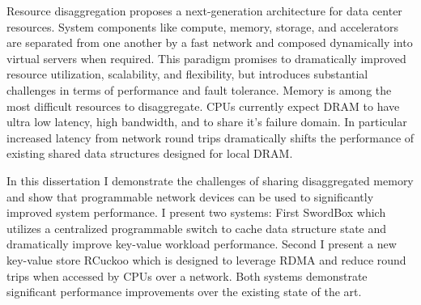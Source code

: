 \documentclass[12pt]{ucsddissertation}
\newcommand{\sword}{SwordBox}
\begin{document}
\begin{dissertationabstract} 
Resource disaggregation proposes a next-generation architecture for data center resources. System
components like compute, memory, storage, and accelerators are separated from one another by a fast
network and composed dynamically into virtual servers when required. This paradigm promises to
dramatically improved resource utilization, scalability, and flexibility, but introduces substantial
challenges in terms of performance and fault tolerance. Memory is among the most difficult resources
to disaggregate. CPUs currently expect DRAM to have ultra low latency, high bandwidth, and to share it's
failure domain. In particular increased latency from network round trips dramatically shifts the
performance of existing shared data structures designed for local DRAM.

In this dissertation I demonstrate the challenges of sharing disaggregated memory and show that
programmable network devices can be used to significantly improved system performance. I present two
systems: First {\sword} which utilizes a centralized programmable switch to cache data structure
state and dramatically improve key-value workload performance. Second I present a new key-value
store RCuckoo which is designed to leverage RDMA and reduce round trips when accessed by CPUs over a
network. Both systems demonstrate significant performance improvements over the existing state of
the art.

\end{dissertationabstract}

\mainmatter
\end{document}
